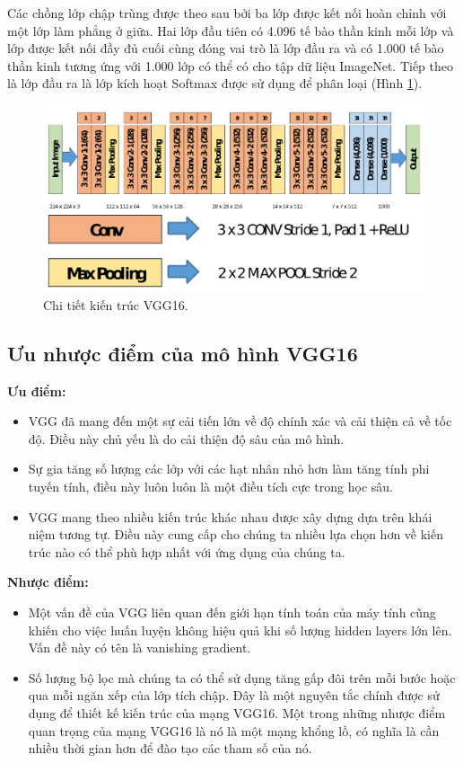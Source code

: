 Các chồng lớp chập trùng được theo sau bởi ba lớp được kết nối hoàn chỉnh với một lớp làm phẳng ở giữa. Hai lớp đầu tiên có 4.096 tế bào thần kinh mỗi lớp và lớp được kết nối đầy đủ cuối cùng đóng vai trò là lớp đầu ra và có 1.000 tế bào thần kinh tương ứng với 1.000 lớp có thể có cho tập dữ liệu ImageNet. Tiếp theo là lớp đầu ra là lớp kích hoạt Softmax được sử dụng để phân loại (Hình \ref{fig:vgg16_imagenet_detail}).

\begin{figure}[H]
	\centering
	\includegraphics[width=1\linewidth]{images/vgg16_imagenet_detail}
	\caption{Chi tiết kiến trúc VGG16.}
	\label{fig:vgg16_imagenet_detail}
\end{figure}

\subsection{Ưu nhược điểm của mô hình VGG16}
\textbf{Ưu điểm:}
\begin{itemize}
	\item VGG đã mang đến một sự cải tiến lớn về độ chính xác và cải thiện cả về tốc độ. Điều này chủ yếu là do cải thiện độ sâu của mô hình.
	\item Sự gia tăng số lượng các lớp với các hạt nhân nhỏ hơn làm tăng tính phi tuyến tính, điều này luôn luôn là một điều tích cực trong học sâu.
	\item VGG mang theo nhiều kiến trúc khác nhau được xây dựng dựa trên khái niệm tương tự. Điều này cung cấp cho chúng ta nhiều lựa chọn hơn về kiến trúc nào có thể phù hợp nhất với ứng dụng của chúng ta.
\end{itemize}
\textbf{Nhược điểm:}
\begin{itemize}
	\item Một vấn đề của VGG liên quan đến giới hạn tính toán của máy tính cũng khiến cho việc huấn luyện không hiệu quả khi số lượng hidden layers lớn lên. Vấn đề này có tên là vanishing gradient.
	\item Số lượng bộ lọc mà chúng ta có thể sử dụng tăng gấp đôi trên mỗi bước hoặc qua mỗi ngăn xếp của lớp tích chập. Đây là một nguyên tắc chính được sử dụng để thiết kế kiến trúc của mạng VGG16. Một trong những nhược điểm quan trọng của mạng VGG16 là nó là một mạng khổng lồ, có nghĩa là cần nhiều thời gian hơn để đào tạo các tham số của nó.
\end{itemize}
